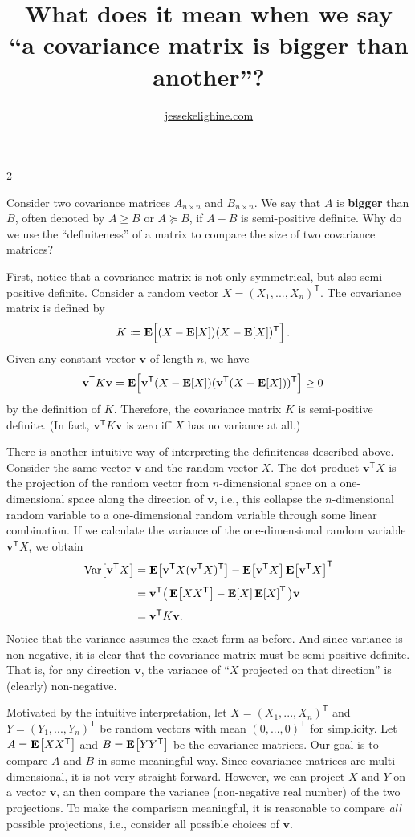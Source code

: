 \documentclass{article}
\title{What does it mean when we say\\``a covariance matrix is \textbf{bigger} than another''?}
\author{\url{jessekelighine.com}}
\DeclareMathOperator{\Exp}{\text{\textbf{E}}}
\DeclareMathOperator{\Var}{\text{Var}}
\newcommand{\E}[2][]{\Exp_{#1}\!\left[#2\right]}
\newcommand{\var}[2][]{\Var_{#1}\!\left[#2\right]}
\newcommand{\T}{^{\mathsf{T}}}
\newcommand{\vv}{\mathbf{v}}
\begin{document}
\maketitle

\begin{multicols}{2}

\noindent
Consider two covariance matrices $A_{n\times n}$ and $B_{n\times n}$.
We say that $A$ is \textbf{bigger} than $B$,
often denoted by $A\geq B$ or $A\succeq B$, if $A-B$ is semi-positive definite.
Why do we use the ``definiteness'' of a matrix to compare the size of two covariance matrices?

First, notice that a covariance matrix is not only symmetrical, but also
semi-positive definite.  Consider a random vector $X=(X_1,...,X_n)\T$.
The covariance matrix is defined by
\begin{align*}
	K &\coloneqq \E{(X-\E{X})(X-\E{X})\T}.
\end{align*}
Given any constant vector $\vv$ of length $n$, we have
\begin{align*}
	\vv\T K \vv &= \E{\vv\T(X-\E{X})(\vv\T(X-\E{X}))\T} \geq 0
\end{align*}
by the definition of $K$.
Therefore, the covariance matrix $K$ is semi-positive definite.
(In fact, $\vv\T K\vv$ is zero iff $X$ has no variance at all.)

There is another intuitive way of interpreting the definiteness described above.
Consider the same vector $\vv$ and the random vector $X$.
The dot product $\vv\T X$ is the projection of the random vector from $n$-dimensional
space on a one-dimensional space along the direction of $\vv$, i.e.,
this collapse the $n$-dimensional random variable to a one-dimensional random variable through some linear combination.
If we calculate the variance of the one-dimensional random variable $\vv\T X$, we obtain
\begin{align*}
	\var{\vv\T X}
	&= \E{\vv\T X(\vv\T X)\T } - \E{\vv\T X}\E{\vv\T X}\T  \\
	&= \vv\T \big(\E{XX\T } - \E{X}\E{X}\T \big)\vv \\
	&= \vv\T K\vv.
\end{align*}
Notice that the variance assumes the exact form as before.
And since variance is non-negative, it is clear that the covariance matrix must be semi-positive definite.
That is, for any direction $\vv$,
the variance of ``$X$ projected on that direction'' is (clearly) non-negative.

Motivated by the intuitive interpretation,
let $X=(X_1,...,X_n)\T$ and $Y=(Y_1,...,Y_n)\T$ be random vectors with mean $(0,...,0)\T$ for simplicity.
Let $A=\E{XX\T}$ and $B=\E{YY\T}$ be the covariance matrices.
Our goal is to compare $A$ and $B$ in some meaningful way.
Since covariance matrices are multi-dimensional, it is not very straight forward.
However, we can project $X$ and $Y$ on a vector $\vv$,
an then compare the variance (non-negative real number) of the two projections.
To make the comparison meaningful,
it is reasonable to compare \emph{all} possible projections,
i.e., consider all possible choices of $\vv$.


\end{multicols}
\end{document}
